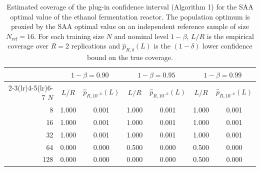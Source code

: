 \begin{table}[t]
  \centering
  \caption{Estimated coverage of the plug-in confidence interval (Algorithm 1) for the SAA optimal value of the ethanol fermentation reactor. The population optimum is proxied by the SAA optimal value on an independent reference sample of size $N_{\mathrm{ref}} = 16$. For each training size $N$ and nominal level $1-\beta$, $L/R$ is the empirical coverage over $R=2$ replications and $\widehat p_{R,\delta}(L)$ is the $(1-\delta)$ lower confidence bound on the true coverage.}
  \label{tab:coverage_plugin}
  \begin{tabular}{rcccccc}
    \toprule
     & \multicolumn{2}{c}{$1-\beta = 0.90$} & \multicolumn{2}{c}{$1-\beta = 0.95$} & \multicolumn{2}{c}{$1-\beta = 0.99$} \\
    \cmidrule(lr){2-3}\cmidrule(lr){4-5}\cmidrule(lr){6-7}
    $N$ & $L/R$ & $\widehat{p}_{R,10^{-6}}(L)$ & $L/R$ & $\widehat{p}_{R,10^{-6}}(L)$ & $L/R$ & $\widehat{p}_{R,10^{-6}}(L)$ \\
    \midrule
    8 & 1.000 & 0.001 & 1.000 & 0.001 & 1.000 & 0.001 \\
    16 & 1.000 & 0.001 & 1.000 & 0.001 & 1.000 & 0.001 \\
    32 & 1.000 & 0.001 & 1.000 & 0.001 & 1.000 & 0.001 \\
    64 & 0.000 & 0.000 & 0.500 & 0.000 & 0.500 & 0.000 \\
    128 & 0.000 & 0.000 & 0.000 & 0.000 & 0.500 & 0.000 \\
    \bottomrule
  \end{tabular}
\end{table}
